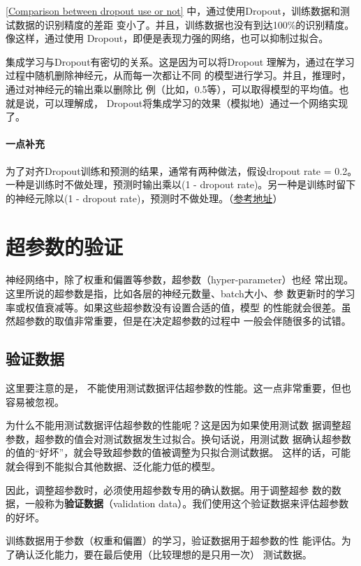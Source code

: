 \autoref{Comparison between dropout use or not} 中，通过使用Dropout，训练数据和测试数据的识别精度的差距
变小了。并且，训练数据也没有到达100\%的识别精度。像这样，通过使用
Dropout，即便是表现力强的网络，也可以抑制过拟合。
\begin{tcolorbox}
    集成学习与Dropout有密切的关系。这是因为可以将Dropout
    理解为，通过在学习过程中随机删除神经元，从而每一次都让不同
    的模型进行学习。并且，推理时，通过对神经元的输出乘以删除比
    例（比如，0.5等），可以取得模型的平均值。也就是说，可以理解成，
    Dropout将集成学习的效果（模拟地）通过一个网络实现了。
\end{tcolorbox}

\paragraph{一点补充} 为了对齐Dropout训练和预测的结果，通常有两种做法，假设dropout rate = 0.2。一种是训练时不做处理，预测时输出乘以(1 - dropout rate)。另一种是训练时留下的神经元除以(1 - dropout rate)，预测时不做处理。（\href{https://www.cnblogs.com/jiangxinyang/p/14333903.html}{参考地址}）
\section{超参数的验证}
神经网络中，除了权重和偏置等参数，超参数（hyper-parameter）也经
常出现。这里所说的超参数是指，比如各层的神经元数量、batch大小、参
数更新时的学习率或权值衰减等。如果这些超参数没有设置合适的值，模型
的性能就会很差。虽然超参数的取值非常重要，但是在决定超参数的过程中
一般会伴随很多的试错。
\subsection{验证数据}
这里要注意的是，
不能使用测试数据评估超参数的性能。这一点非常重要，但也容易被忽视。

为什么不能用测试数据评估超参数的性能呢？这是因为如果使用测试数
据调整超参数，超参数的值会对测试数据发生过拟合。换句话说，用测试数
据确认超参数的值的“好坏”，就会导致超参数的值被调整为只拟合测试数据。
这样的话，可能就会得到不能拟合其他数据、泛化能力低的模型。

因此，调整超参数时，必须使用超参数专用的确认数据。用于调整超参
数的数据，一般称为\textbf{验证数据}（validation data）。我们使用这个验证数据来评估超参数的好坏。
\begin{tcolorbox}
    训练数据用于参数（权重和偏置）的学习，验证数据用于超参数的性
    能评估。为了确认泛化能力，要在最后使用（比较理想的是只用一次）
    测试数据。
\end{tcolorbox}
